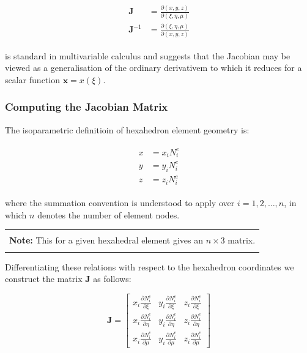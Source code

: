 \documentclass[10pt,b5paper,titlepage]{book}
\newcommand{\m}{\mathbf}
\newenvironment{bbox}[1][0.96]
{
    \begin{center}
        \begin{tabular}{|p{#1\textwidth}|}
            \hline\\
}
{
            \\\\\hline
        \end{tabular}
    \end{center}
}
\newenvironment{eqarray}
{
    \begin{eqnarray}
        \begin{aligned}
}
{
        \end{aligned}
    \end{eqnarray}
}
\begin{document}
\begin{eqarray}
    \m{J} &=
    \frac{\partial \left(x, y, z \right)}{\partial \left(\xi, \eta, \mu \right)}\\
    \m{J}^{-1} &=
    \frac{\partial \left(\xi, \eta, \mu \right)}{\partial \left(x, y, z \right)}
\end{eqarray}

is standard in multivariable calculus and suggests that the Jacobian may be viewed as
a generalisation of the ordinary derivativem to which it reduces for a scalar
function $ \m{x} = x(\xi) $.



\subsubsection{Computing the Jacobian Matrix}
The isoparametric definitioin of hexahedron element geometry is:

\begin{eqarray}
    x &= x_i N_i^e\\
    y &= y_i N_i^e\\
    z &= z_i N_i^e
\end{eqarray}

where the summation convention is understood to apply over $ i = 1, 2, \dots , n $,
in which $ n $ denotes the number of element nodes.

\begin{bbox}
    \textbf{Note:} This for a given hexahedral element gives an $ n \times 3 $ matrix.
\end{bbox}


Differentiating these relations with respect to the hexahedron coordinates we construct
the matrix $ \m{J} $ as follows:

\begin{equation}
    \m{J} =
    \begin{bmatrix}
        x_i \frac{\partial N_i^e}{\partial \xi} &
        y_i \frac{\partial N_i^e}{\partial \xi} &
        z_i \frac{\partial N_i^e}{\partial \xi}\\
        x_i \frac{\partial N_i^e}{\partial \eta} &
        y_i \frac{\partial N_i^e}{\partial \eta} &
        z_i \frac{\partial N_i^e}{\partial \eta}\\
        x_i \frac{\partial N_i^e}{\partial \mu} &
        y_i \frac{\partial N_i^e}{\partial \mu} &
        z_i \frac{\partial N_i^e}{\partial \mu}
    \end{bmatrix}
\end{equation}
\end{document}
